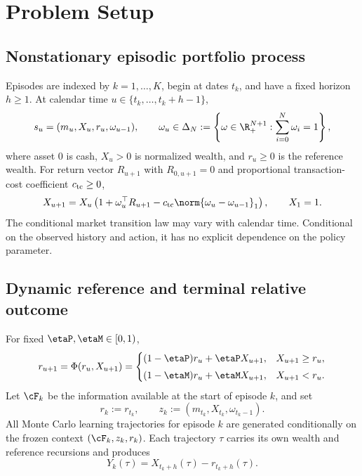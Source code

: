 \section{Problem Setup}\label{sec:setup}

\subsection{Nonstationary episodic portfolio process}

Episodes are indexed by $k=1,\ldots,K$, begin at dates $t_k$, and have a fixed horizon $h\ge1$.  At calendar time $u\in\{t_k,\ldots,t_k+h-1\}$,
\begin{equation}\label{eq:state-action}
 s_u=(m_u,X_u,r_u,\omega_{u-1}),
 \qquad
 \omega_u\in\Delta_N:=\left\{\omega\in\R_+^{N+1}:\sum_{i=0}^{N}\omega_i=1\right\},
\end{equation}
where asset $0$ is cash, $X_u>0$ is normalized wealth, and $r_u\ge0$ is the reference wealth.  For return vector $R_{u+1}$ with $R_{0,u+1}=0$ and proportional transaction-cost coefficient $c_{\rm tc}\ge0$,
\begin{equation}\label{eq:wealth-update}
 X_{u+1}=X_u\left(1+\omega_u^\top R_{u+1}
 -c_{\rm tc}\norm{\omega_u-\omega_{u-1}}_1\right),
 \qquad X_1=1.
\end{equation}
The conditional market transition law may vary with calendar time.  Conditional on the observed history and action, it has no explicit dependence on the policy parameter.

\subsection{Dynamic reference and terminal relative outcome}

For fixed $\etaP,\etaM\in[0,1)$,
\begin{equation}\label{eq:reference-update}
 r_{u+1}=\Phi(r_u,X_{u+1})
 =\begin{cases}
 (1-\etaP)r_u+\etaP X_{u+1}, & X_{u+1}\ge r_u,\\[1mm]
 (1-\etaM)r_u+\etaM X_{u+1}, & X_{u+1}<r_u.
 \end{cases}
\end{equation}
Let $\cF_k$ be the information available at the start of episode $k$, and set
\begin{equation}\label{eq:start-context}
 r_k:=r_{t_k},
 \qquad
 z_k:=(m_{t_k},X_{t_k},\omega_{t_k-1}).
\end{equation}
All Monte Carlo learning trajectories for episode $k$ are generated conditionally on the frozen context $(\cF_k,z_k,r_k)$.  Each trajectory $\tau$ carries its own wealth and reference recursions and produces
\begin{equation}\label{eq:relative-outcome}
 Y_k(\tau)=X_{t_k+h}(\tau)-r_{t_k+h}(\tau).
\end{equation}

